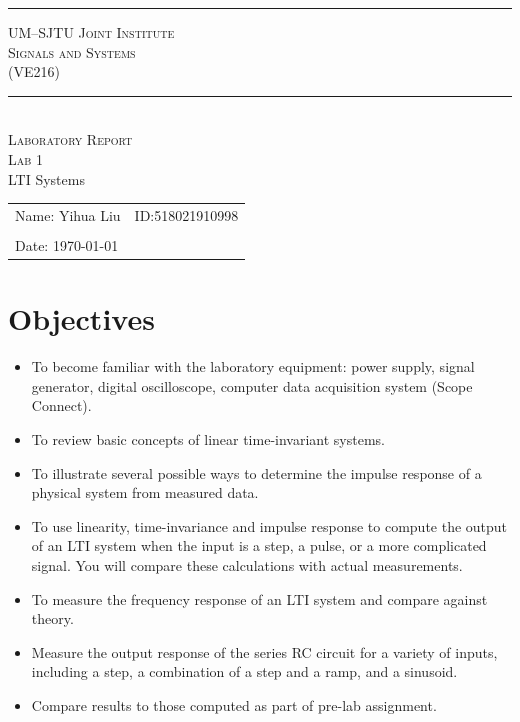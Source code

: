 \documentclass[a4paper]{article}
\begin{document}
\begin{titlepage}
	\begin{Large}
		\begin{center}
			\noindent\rule[0.25\baselineskip]{\textwidth}{1pt}
			\vspace{0.5cm}
			\textsc{UM--SJTU Joint Institute}\\
			\vspace{0.25cm}
			\textsc{Signals and Systems\\(VE216)}
			\noindent\rule[0.25\baselineskip]{\textwidth}{1pt}
			\vspace{4.9cm}\\
			\textsc{Laboratory Report}\\
			\vspace{0.85cm}
			\textsc{Lab 1}\\
			\vspace{0.5em}
			LTI Systems
			\vspace{6cm}
		\end{center}
	\end{Large}
	\begin{tabular}{ll}
		Name: Yihua Liu&ID:518021910998\\
		&\\
		Date: \today&\\
	\end{tabular}
\end{titlepage}
\newpage
\renewcommand\thesection{\arabic{section}}
\section{Objectives}
\begin{itemize}
	\item To become familiar with the laboratory equipment: power supply, signal generator, digital oscilloscope, computer data acquisition system (Scope Connect).
	\item To review basic concepts of linear time-invariant systems.
	\item To illustrate several possible ways to determine the impulse response of a physical system from measured data.
	\item To use linearity, time-invariance and impulse response to compute the output of an LTI system when the input is a step, a pulse, or a more complicated signal. You will compare these calculations with actual measurements.
	\item To measure the frequency response of an LTI system and compare against theory.
	\item Measure the output response of the series RC circuit for a variety of inputs, including a step, a combination of a step and a ramp, and a sinusoid.
	\item Compare results to those computed as part of pre-lab assignment.
\end{itemize}
\end{document}
